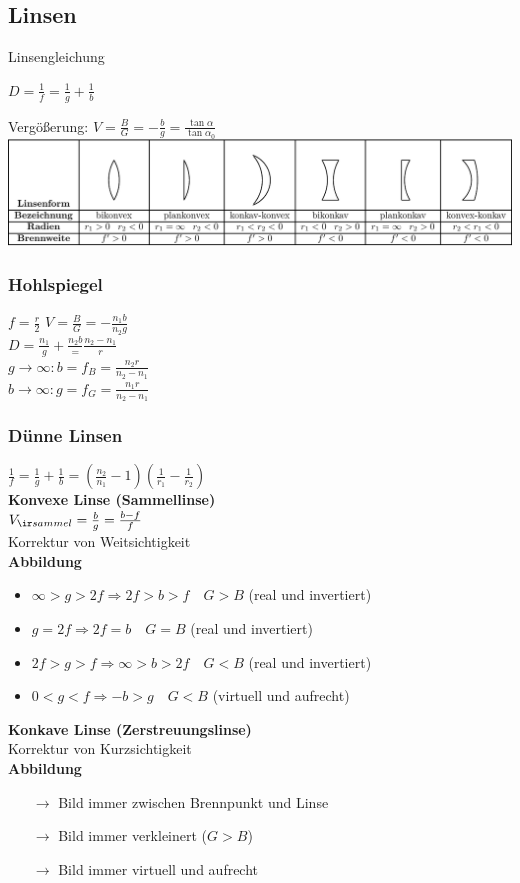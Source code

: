 \documentclass[german]{latex4ei/latex4ei_sheet}
\begin{document}
\begin{sectionbox}
\subsection{Linsen}
Linsengleichung
\begin{emphbox}
$D=\frac{1}{f}=\frac{1}{g}+\frac{1}{b}$	
\end{emphbox}
Vergößerung: $V=\frac{B}{G}= - \frac{b}{g}=\frac{\tan \alpha}{\tan \alpha_0}$\\
\includegraphics[width=\columnwidth]{img/Linsen_crop.pdf}
\subsubsection{Hohlspiegel}
$f=\frac{r}{2}$ \qquad $V=\frac{B}{G}= - \frac{n_1b}{n_2g}$ \\
$D=\frac{n_1}{g}+\frac{n_2b}=\frac{n_2-n_1}{r}$\\
$g\rightarrow \infty: b=f_B=\frac{n_2r}{n_2-n_1}$\\
$b\rightarrow \infty: g=f_G=\frac{n_1r}{n_2-n_1}$\\
\subsubsection{Dünne Linsen}
$\frac{1}{f}=\frac{1}{g}+\frac{1}{b}=(\frac{n_2}{n_1}-1)(\frac{1}{r_1}-\frac{1}{r_2})$\\
\textbf{Konvexe Linse (Sammellinse)} \\
$V_{\ir sammel}= \frac{b}{g}=\frac{b-f}{f}$\\
Korrektur von Weitsichtigkeit \\
\textbf{Abbildung}
\begin{itemize}
	\item $\infty > g > 2f \Rightarrow 2f>b>f \quad G>B$ (real und invertiert)
	\item $g=2f \Rightarrow 2f=b \quad G=B$ (real und invertiert)
	\item $2f>g>f \Rightarrow \infty >b>2f \quad G<B$ (real und invertiert)
	\item $0<g<f \Rightarrow -b>g \quad G<B$ (virtuell und aufrecht)
\end{itemize}
\textbf{Konkave Linse (Zerstreuungslinse)}\\
Korrektur von Kurzsichtigkeit\\
\textbf{Abbildung}
\begin{itemize}
\item[$\rightarrow$] Bild immer zwischen Brennpunkt und Linse
\item[$\rightarrow$] Bild immer verkleinert ($G>B$)
\item[$\rightarrow$] Bild immer virtuell und aufrecht
\end{itemize}

\end{sectionbox}
\end{document}
